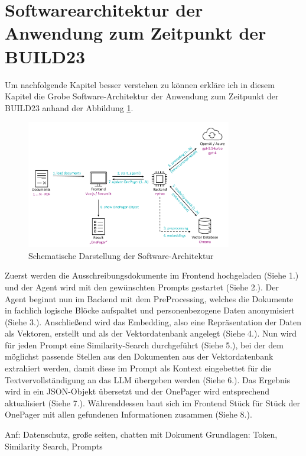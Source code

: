 \section{Softwarearchitektur der Anwendung zum Zeitpunkt der BUILD23}
Um nachfolgende Kapitel besser verstehen zu können erkläre ich in diesem Kapitel die Grobe Software-Architektur der
Anwendung zum Zeitpunkt der BUILD23 anhand der Abbildung \ref{fig:DokumentenAgent-uebersicht}.

\begin{figure}[h]
    \centering
    \includegraphics[width=0.8\textwidth]{figures/DokumentenAgent-Uebersicht.png}
    \caption{Schematische Darstellung der Software-Architektur}
    \label{fig:DokumentenAgent-uebersicht}    %
\end{figure}

Zuerst werden die Ausschreibungsdokumente im Frontend hochgeladen (Siehe 1.) und der Agent wird mit den gewünschten Prompts
gestartet (Siehe 2.). Der Agent beginnt nun im Backend mit dem PreProcessing, welches die Dokumente in fachlich logische Blöcke
aufspaltet und personenbezogene Daten anonymisiert (Siehe 3.). Anschließend wird das Embedding, also eine Repräsentation der Daten
als Vektoren, erstellt und als der Vektordatenbank angelegt (Siehe 4.). Nun wird für jeden Prompt eine Similarity-Search
durchgeführt (Siehe 5.), bei der dem möglichst passende Stellen aus den Dokumenten aus der Vektordatenbank extrahiert werden, damit
diese im Prompt als Kontext eingebettet für die Textvervollständigung an das LLM übergeben werden (Siehe 6.). Das Ergebnis wird in
ein JSON-Objekt übersetzt und der OnePager wird entsprechend aktualisiert (Siehe 7.). Währenddessen baut sich im Frontend Stück für
Stück der OnePager mit allen gefundenen Informationen zusammen (Siehe 8.).

Anf: Datenschutz, große seiten, chatten mit Dokument
Grundlagen: Token, Similarity Search, Prompts

